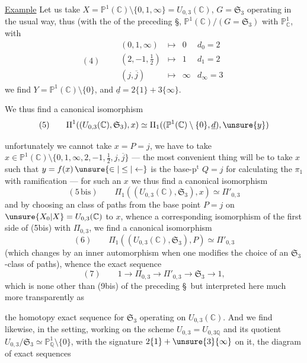 \uline{Example} Let us take $X=\mathbb P^1(\mathbb C)\setminus\{0,1,\infty\}=U_{0,3}(\mathbb C)$,
$G=\mathfrak S_3$ operating in the usual way, thus (with the   of the preceding \S\),
 $\mathbb P^1(\mathbb C)/(G=\mathfrak S_3)$ with $\mathbb P^1_{\mathbb C}$, with
\[
(4)\qquad
\begin{array}{rcll}
(0,1,\infty)&\longmapsto&0&d_0=2\\
(2,-1,\tfrac12)&\longmapsto&1&d_1=2\\
(j,\overline j)&\longmapsto&\infty&d_\infty=3
\end{array}
\]
we find $Y=\mathbb P^1(\mathbb C)\setminus\{0\}$, and $\underline d=2\{1\}+3\{\infty\}$.

We thus find a canonical isomorphism
\[
(5)\qquad
\Pi^{1}((U_{0,3}(\mathbb C),\mathfrak S_3),x)
\simeq\Pi_1((\mathbb P^1(\mathbb C)\setminus\{0\},\underline d),\unsure{y})
\]


 unfortunately we cannot take $x=P=j$, we have to take
$x\in\mathbb P^1(\mathbb C)\setminus\{0,1,\infty,2,-1,\tfrac12,j,\overline j\}$
--- the most convenient thing will be to take $x$ such that $y=f(x)\,\unsure{\in|\leq|\leftarrow}$ is the  base-$\mathrm p^{\mathrm t}$ $Q=j$ for calculating the $\pi_1$ with ramification --- for such an $x$ we thus find a canonical isomorphism
\[
(5\,\mathrm{bis})\qquad
\Pi_1((U_{0,3}(\mathbb C),\mathfrak S_3),x)\simeq\Pi'_{0,3}
\]
and by choosing an class of paths from the  base point $P=j$ on $\unsure{X_0|X}=U_{0,3}(\mathbb C)$ to $x$, whence a corresponding isomorphism of the first side of (5bis)  with $\Pi_{0,3}$, we find a canonical isomorphism
\[
(6)\qquad
\Pi_1((U_{0,3}(\mathbb C),\mathfrak S_3),P)\simeq\Pi'_{0,3}
\]
(which changes by an inner automorphism when one modifies the choice of an $\mathfrak S_3$-class of paths), whence the exact sequence
\[
(7)\qquad
1\longrightarrow\Pi_{0,3}\longrightarrow\Pi'_{0,3}\longrightarrow\mathfrak S_3\longrightarrow 1,
\]
which is none other than (9bis) of the preceding \S\, but interpreted here much more transparently as

the homotopy exact sequence for $\mathfrak{S}_3$ operating
on $U_{0,3}(\mathbb{C})$. And we find likewise,
in the  setting,
working on the scheme $U_{0,3}=U_{0,3\mathbb{Q}}$ and its
quotient $U_{0,3}/\mathfrak{S}_3\simeq\mathbb{P}^{1}_{\mathbb{Q}}\setminus\{0\}$, with
the signature $2\{1\}+\unsure{3}\{\infty\}$ on it, the
diagram of exact sequences

